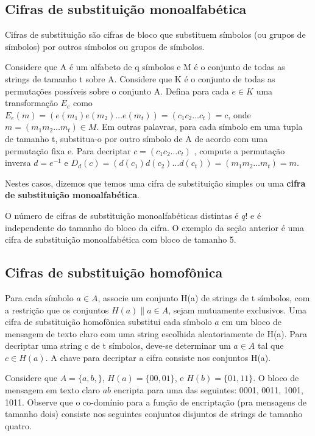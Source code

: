 \documentclass[
	10pt,				%
	openright,			%
	twoside,			%
	a5paper,			%
	english,			%
	french,				%
	spanish,			%
	brazil,				%
	sumario=tradicional
]{abntex2}
\begin{document}
\subsection{Cifras de substituição monoalfabética}

Cifras de substituição são cifras de bloco que substituem símbolos (ou grupos de símbolos) por outros símbolos ou grupos de símbolos.

Considere que A é um alfabeto de q símbolos e M é o conjunto de todas as strings de tamanho t sobre A. Considere que K é o conjunto de todas as permutações possíveis sobre o conjunto A. Defina para cada $e \in K$ uma transformação $E_e$ como $E_e (m) = (e(m_1 )e(m_2 ) \ldots e(m_t)) = (c_1 c_2 \ldots c_t ) = c$, onde $m = (m_1 m_2 \ldots m_t) \in M$. Em outras palavras, para cada símbolo em uma tupla de tamanho t, substitua-o por outro símbolo de A de acordo com uma permutação fixa e. Para decriptar $c = (c_1 c_2 \ldots c_t)$ , compute a permutação inversa $d = e^{-1}$ e $D_d (c) = (d(c_1)d(c_2 ) \ldots d(c_t)) = (m_1 m_2 \ldots m_t) = m$.

Nestes casos, dizemos que temos uma cifra de substituição simples ou uma \textbf{cifra de substituição monoalfabética}.

O número de cifras de substituição monoalfabéticas distintas é $q!$ e é independente do tamanho do bloco da cifra. O exemplo da seção anterior é uma cifra de substituição monoalfabética com bloco de tamanho 5.

\subsection{Cifras de substituição homofônica}

Para cada símbolo $a \in A$, associe um conjunto H(a) de strings de t símbolos, com a restrição que os conjuntos $H(a) \| a \in A$, sejam mutuamente exclusivos. Uma cifra de substituição homofônica substitui cada símbolo $a$ em um bloco de mensagem de texto claro com uma string escolhida aleatoriamente de H(a). Para decriptar uma string c de t símbolos, deve-se determinar um $a \in A$ tal que $c \in H(a)$. A chave para decriptar a cifra consiste nos conjuntos H(a).

Considere que $A = \{ a, b, \}$, $H(a) = \{ 00, 01 \}$, e $H(b) = \{ 01, 11 \}$. O bloco de mensagem em texto claro $ab$ encripta para uma das seguintes: 0001, 0011, 1001, 1011. Observe que o co-domínio para a função de encriptação (pra mensagens de tamanho dois) consiste nos seguintes conjuntos disjuntos de strings de tamanho quatro.
\end{document}
